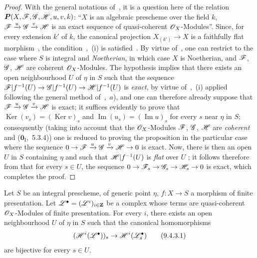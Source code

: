 \begin{proof}
With the general notations of~, it is a question here of the relation $\boldsymbol{P}(X,\mathscr{F},\mathscr{G},\mathscr{H},u,v,k)$: ``$X$ is an algebraic prescheme over the field $k$, $\mathscr{F}\xrightarrow{u}\mathscr{G}\xrightarrow{v}\mathscr{H}$ is an exact sequence of quasi-coherent $\mathscr{O}_X$-Modules''.
Since, for every extension $k'$ of $k$, the canonical projection $X_{(k')}\to X$ is a faithfully flat morphism~, the condition~,~(i) is satisfied~.
By virtue of~, one can restrict to the case where $S$ is integral and \emph{Noetherian}, in which case $X$ is Noetherian, and $\mathscr{F}$, $\mathscr{G}$, $\mathscr{H}$ are coherent $\mathscr{O}_X$-Modules.
The hypothesis implies that there exists an open neighbourhood $U$ of $\eta$ in $S$ such that the sequence $\mathscr{F}|f^{-1}(U)\to\mathscr{G}|f^{-1}(U)\to\mathscr{H}|f^{-1}(U)$ is \emph{exact}, by virtue of~,~(i) applied following the general method of~,~$a$), and one can therefore already suppose that $\mathscr{F}\xrightarrow{u}\mathscr{G}\xrightarrow{v}\mathscr{H}$ is exact; it suffices evidently to prove that $\operatorname{Ker}(v_s)=(\operatorname{Ker} v)_s$ and $\operatorname{Im}(u_s)=(\operatorname{Im} u)_s$ for every $s$ near $\eta$ in $S$; consequently (taking into account that the $\mathscr{O}_X$-Modules $\mathscr{F}$, $\mathscr{G}$, $\mathscr{H}$ are \emph{coherent} and
($\mathbf{0}_{\mathrm{I}}$,~5.3.4)) one is reduced to proving the proposition in the particular case where the sequence
$0\to\mathscr{F}\xrightarrow{u}\mathscr{G}\xrightarrow{v}\mathscr{H}\to0$
is exact.
Now, there is then an open $U$ in $S$ containing $\eta$ and such that
$\mathscr{H}|f^{-1}(U)$ is \emph{flat} over $U$ ; it follows therefore from 
that for every $s\in U$, the sequence $0\to\mathscr{F}_s\to\mathscr{G}_s\to\mathscr{H}_s\to0$
is exact, which completes the proof.
\end{proof}

\begin{corollary}[9.4.3]
\label{IV.9.4.3}
Let $S$ be an integral prescheme, of generic point $\eta$, $f:X\to S$ a morphism of finite presentation.
Let $\mathscr{L}^\bullet=(\mathscr{L}^i)_{i\in\mathbf{Z}}$ be a complex whose terms are quasi-coherent $\mathscr{O}_X$-Modules of finite presentation.
For every $i$, there exists an open neighbourhood $U$ of $\eta$ in $S$ such that the canonical homomorphisms
\begin{equation}
\label{IV.9.4.3.1}
  (\mathscr{H}^i(\mathscr{L}^\bullet))_s\to\mathscr{H}^i(\mathscr{L}^\bullet_s) \tag{9.4.3.1}
\end{equation}
are bijective for every $s\in U$.
\end{corollary}

